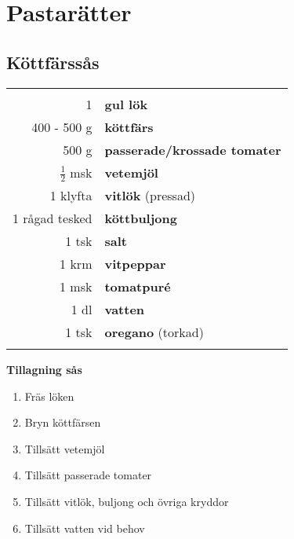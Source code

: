 
\section{Pastarätter}

\clearpage

\subsection{Köttfärssås}

\begin{table}[H]
	\begin{tabular}{rl}
	\hline
	&\\
		1 & \textbf{gul lök} \\
		400 - 500 g & \textbf{köttfärs}\\
		500 g & \textbf{passerade/krossade tomater}\\
		$\frac{1}{2}$ msk & \textbf{vetemjöl}\\
		1 klyfta & \textbf{vitlök} (pressad)\\
		1 rågad tesked & \textbf{köttbuljong}\\
		1 tsk & \textbf{salt}\\
		1 krm & \textbf{vitpeppar}\\
		1 msk & \textbf{tomatpuré}\\
		1 dl & \textbf{vatten}\\
		1 tsk & \textbf{oregano} (torkad) \\
	&\\
	\hline
	\end{tabular}
\end{table}


\begin{multicols*}{2}

\noindent \textbf{Tillagning sås}
\begin{enumerate}
	\itemsep0cm
	\item Fräs löken
	\item Bryn köttfärsen
	\item Tillsätt vetemjöl
	\item Tillsätt passerade tomater
	\item Tillsätt vitlök, buljong och övriga kryddor
	\item Tillsätt vatten vid behov
\end{enumerate}

\end{multicols*}

